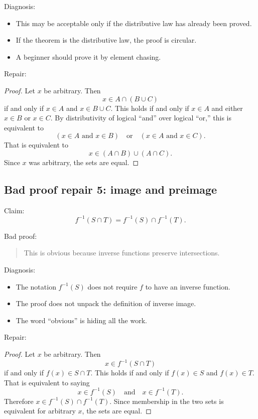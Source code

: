 Diagnosis:

\begin{itemize}
\item This may be acceptable only if the distributive law has already been proved.
\item If the theorem is the distributive law, the proof is circular.
\item A beginner should prove it by element chasing.
\end{itemize}

Repair:

\begin{proof}
Let $x$ be arbitrary. Then
\[
x\in A\cap(B\cup C)
\]
if and only if $x\in A$ and $x\in B\cup C$. This holds if and only if $x\in A$ and either $x\in B$ or $x\in C$. By distributivity of logical ``and'' over logical ``or,'' this is equivalent to
\[
(x\in A\text{ and }x\in B)\quad\text{or}\quad(x\in A\text{ and }x\in C).
\]
That is equivalent to
\[
x\in(A\cap B)\cup(A\cap C).
\]
Since $x$ was arbitrary, the sets are equal.
\end{proof}

\subsection{Bad proof repair 5: image and preimage}

Claim:
\[
f^{-1}(S\cap T)=f^{-1}(S)\cap f^{-1}(T).
\]

Bad proof:

\begin{quote}
This is obvious because inverse functions preserve intersections.
\end{quote}

Diagnosis:

\begin{itemize}
\item The notation $f^{-1}(S)$ does not require $f$ to have an inverse function.
\item The proof does not unpack the definition of inverse image.
\item The word ``obvious'' is hiding all the work.
\end{itemize}

Repair:

\begin{proof}
Let $x$ be arbitrary. Then
\[
x\in f^{-1}(S\cap T)
\]
if and only if $f(x)\in S\cap T$. This holds if and only if $f(x)\in S$ and $f(x)\in T$. That is equivalent to saying
\[
x\in f^{-1}(S)\quad\text{and}\quad x\in f^{-1}(T).
\]
Therefore $x\in f^{-1}(S)\cap f^{-1}(T)$. Since membership in the two sets is equivalent for arbitrary $x$, the sets are equal.
\end{proof}

